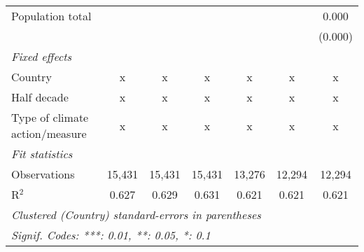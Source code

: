 \begin{tabular}{lcccccc}
   Population total                                                  &              &              &               &               &               & 0.000\\   
                                                                     &              &              &               &               &               & (0.000)\\   
   \emph{Fixed effects}\\
   Country                                                           & x            & x            & x             & x             & x             & x\\  
   Half decade                                                       & x            & x            & x             & x             & x             & x\\  
   Type of climate action/measure                                    & x            & x            & x             & x             & x             & x\\  
   \midrule \emph{Fit statistics}\\
   Observations                                                      & 15,431       & 15,431       & 15,431        & 13,276        & 12,294        & 12,294\\  
   R$^2$                                                             & 0.627        & 0.629        & 0.631         & 0.621         & 0.621         & 0.621\\  
   \midrule
   \multicolumn{7}{l}{\emph{Clustered (Country) standard-errors in parentheses}}\\
   \multicolumn{7}{l}{\emph{Signif. Codes: ***: 0.01, **: 0.05, *: 0.1}}\\
\end{tabular}
\par\endgroup


